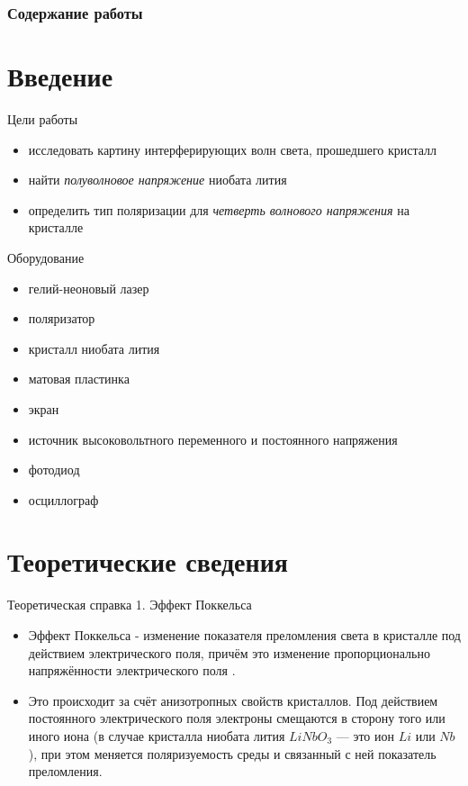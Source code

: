 \documentclass[11pt]{beamer} %
\begin{document}
\frame{\titlepage}

\begin{frame}
    \frametitle{Содержание работы}
    \tableofcontents
\end{frame}

\section{Введение}
    \begin{frame}{Цели работы}
        \begin{itemize}
            \item исследовать картину интерферирующих волн света, прошедшего кристалл
            \item найти \textit{полуволновое напряжение} ниобата лития
            \item определить тип поляризации для \textit{четверть волнового напряжения} на кристалле
        \end{itemize}
    \end{frame}

    \begin{frame}{Оборудование}
        \begin{itemize}
            \item гелий-неоновый лазер
            \item поляризатор
            \item кристалл ниобата лития
            \item матовая пластинка
            \item экран
            \item источник высоковольтного переменного и постоянного напряжения
            \item фотодиод
            \item осциллограф
        \end{itemize}
    \end{frame}
    
\section{Теоретические сведения} 
    \begin{frame}{Теоретическая справка 1. Эффект Поккельса}
        \begin{itemize}
            \item Эффект Поккельса - изменение показателя преломления света в кристалле под действием электрического поля, причём это изменение пропорционально напряжённости электрического поля \cite{lab}.
            \item Это происходит за счёт анизотропных свойств кристаллов. Под действием постоянного электрического поля электроны смещаются в сторону того или иного иона (в случае кристалла ниобата лития $LiNbO_3$ — это ион $Li$ или $Nb$), при этом меняется поляризуемость среды и связанный с ней показатель преломления.
        \end{itemize}
    \end{frame}
\end{document}
